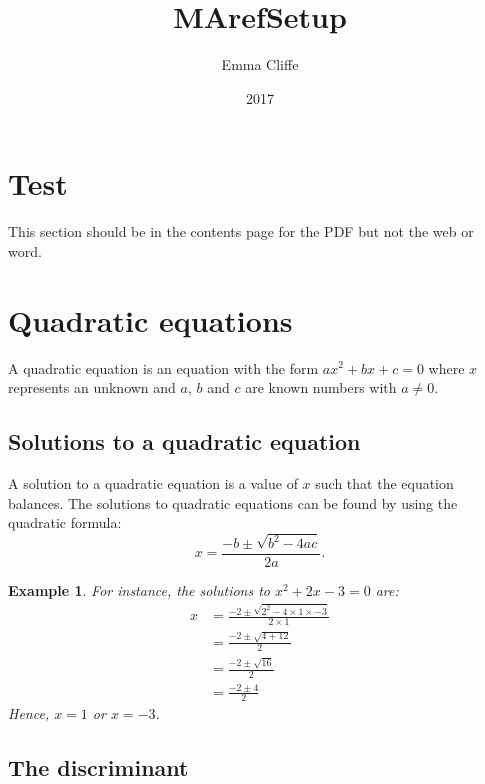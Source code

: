 \documentclass[12pt,a4paper]{article}
\title{MArefSetup}
\author{Emma Cliffe}
\date{2017}
\newtheorem*{example*}{Example}
\theoremstyle{definition}
\theoremstyle{remark}
\begin{document}
\maketitle

\tableofcontents

\section*{Test}

This section should be in the contents page for the PDF but not the web or word. 

\section{Quadratic equations}

A quadratic equation is an equation with the form \(ax^2 + bx + c = 0\) where \(x\) represents an unknown and \(a\), \(b\) and \(c\) are known numbers with \(a \neq 0\). 

\subsection{Solutions to a quadratic equation}

A solution to a quadratic equation is a value of \(x\) such that the equation balances. The solutions to quadratic equations can be found by using the quadratic formula: 
\begin{equation}
\label{quadform}
x = \frac{-b \pm \sqrt{b^2-4ac}}{2a}.
\end{equation}

\begin{example*}
For instance, the solutions to \(x^2 + 2x -3 = 0\) are:
\begin{align*}
x &= \frac{-2 \pm \sqrt{2^2-4\times 1 \times -3}}{2 \times 1}\\
\,&= \frac{-2 \pm \sqrt{4+12}}{2}\\
\,&= \frac{-2 \pm \sqrt{16}}{2}\\
\,&= \frac{-2 \pm 4}{2}
\end{align*} 
Hence, \(x = 1\) or \(x = -3\).  
\end{example*}

\subsection{The discriminant}
\end{document}
